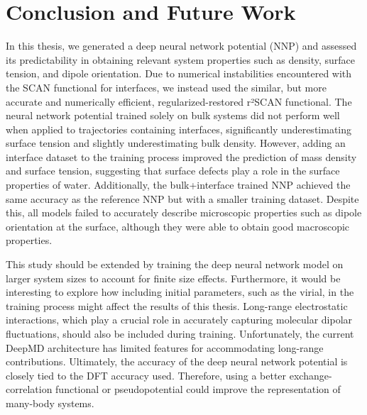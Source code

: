 \chapter{Conclusion and Future Work}

In this thesis, we generated a deep neural network potential (NNP) and assessed its predictability in obtaining relevant system properties such as density, surface tension, and dipole orientation. Due to numerical instabilities encountered with the SCAN functional for interfaces, we instead used the similar, but more accurate and numerically efficient, regularized-restored r²SCAN functional. The neural network potential trained solely on bulk systems did not perform well when applied to trajectories containing interfaces, significantly underestimating surface tension and slightly underestimating bulk density. However, adding an interface dataset to the training process improved the prediction of mass density and surface tension, suggesting that surface defects play a role in the surface properties of water. Additionally, the bulk+interface trained NNP achieved the same accuracy as the reference NNP but with a smaller training dataset. Despite this, all models failed to accurately describe microscopic properties such as dipole orientation at the surface, although they were able to obtain good macroscopic properties.

This study should be extended by training the deep neural network model on larger system sizes to account for finite size effects. Furthermore, it would be interesting to explore how including initial parameters, such as the virial, in the training process might affect the results of this thesis. Long-range electrostatic interactions, which play a crucial role in accurately capturing molecular dipolar fluctuations, should also be included during training. Unfortunately, the current DeepMD architecture has limited features for accommodating long-range contributions. Ultimately, the accuracy of the deep neural network potential is closely tied to the DFT accuracy used. Therefore, using a better exchange-correlation functional or pseudopotential could improve the representation of many-body systems.
